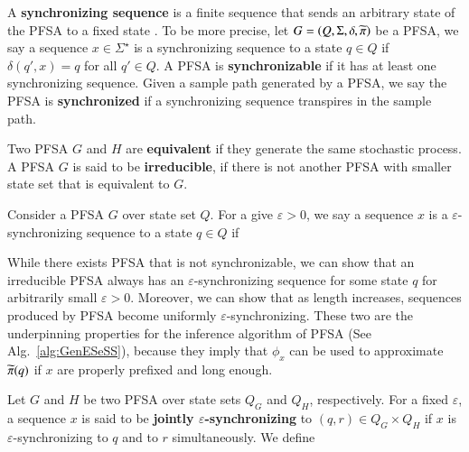 \begin{defn}
A \textbf{synchronizing sequence} is a finite sequence that sends an arbitrary state of the PFSA to a fixed state \cite{trahtman2008road}. To be more precise, let $G=\left( Q, \Sigma, \delta, \widetilde{\pi} \right)$ be a PFSA, we say a sequence $x\in\Sigma^{\star}$ is a synchronizing sequence to a state $q \in Q$ if $\delta(q', x) = q$ for all $q'\in {Q}$. A PFSA is \textbf{synchronizable} if it has at least one synchronizing sequence. Given a sample path generated by a PFSA, we say the PFSA is \textbf{synchronized} if a synchronizing sequence transpires in the sample path.    
\end{defn}

\begin{defn}
Two PFSA $G$ and $H$ are \textbf{equivalent} if they generate the same stochastic process. A PFSA $G$ is said to be \textbf{irreducible}, if there is not another PFSA with smaller state set that is equivalent to $G$. 
\end{defn}
\begin{defn}
Consider a PFSA $G$ over state set $Q$. For a give $\varepsilon > 0$, we say a sequence $x$ is a $\varepsilon$-synchronizing sequence to a state $q\in Q$ if
\end{defn}
While there exists PFSA that is not synchronizable, we can show that an irreducible PFSA always has an $\varepsilon$-synchronizing sequence for some state $q$ for arbitrarily small $\varepsilon > 0$. Moreover, we can show that as length increases, sequences produced by PFSA become uniformly $\varepsilon$-synchronizing. These two are the underpinning properties for the inference algorithm of PFSA (See Alg.~\ref{alg:GenESeSS}), because they imply that $\phi_x$ can be used to approximate $\widetilde{\pi}(q)$ if $x$ are properly prefixed and long enough.

\begin{defn}
\label{def:JointSyncSeq}
Let $G$ and $H$ be two PFSA over state sets $Q_{G}$ and $Q_H$, respectively. For a fixed $\varepsilon$, a sequence $x$ is said to be \textbf{jointly $\varepsilon$-synchronizing} to $(q, r)\in{Q_{G}}\times Q_{H}$ if $x$ is $\varepsilon$-synchronizing to $q$ and to $r$ simultaneously. We define
\end{defn}


